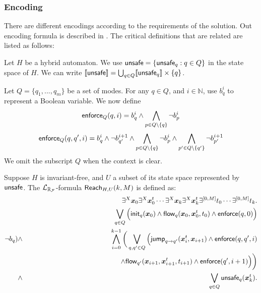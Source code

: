 \subsubsection{Encoding}
There are different encodings according to the requirements of the
solution. Out encoding formula is described in
\cite{gao2014delta}. The critical definitions that are related are
listed as follows:

\begin{definition}
Let $H$ be a hybrid automaton. We use $\mathsf{unsafe} = \{\mathsf{unsafe}_q:q\in Q\}$
in the state space of $H$. We can write $\llbracket \mathsf{unsafe}\rrbracket
= \bigcup_{q\in Q} \llbracket \mathsf{unsafe}_q \rrbracket\times \{q\}$.
\end{definition}

\begin{definition}
Let $Q = \{q_1,...,q_m\}$ be a set of modes. For any $q\in Q$, and
$i\in\mathbb{N}$, use $b_{q}^i$ to represent a Boolean variable. We
now define
$$\mathsf{enforce}_Q(q,i) = b^i_{q} \wedge \bigwedge_{p\in Q\setminus\{q\}}\neg b^{i}_{p}$$
$$\mathsf{enforce}_Q(q, q',i) = b^{i}_{q}\wedge \neg b^{i+1}_{q'} \wedge
\bigwedge_{p\in Q\setminus\{q\}} \neg b^i_{p} \wedge \bigwedge_{p'\in
  Q\setminus\{q'\}} \neg b^{i+1}_{p'}$$ We omit the subscript $Q$ when
the context is clear.
\end{definition}

\begin{definition}
Suppose $H$ is invariant-free, and $U$ a subset of its state space
represented by $\mathsf{unsafe}$. The $\mathcal{L}_{\mathbb{R}_{\mathcal{F}}}$-formula $\mathsf{Reach}_{H,U}(k,M)$ is
defined as:
\begin{eqnarray*}
& &\exists^X \vec x_{0} \exists^X\vec x_{0}^t\cdots \exists^X \vec
  x_{k}\exists^X\vec x_{k}^t\exists^{[0,M]}t_0\cdots
  \exists^{[0,M]}t_k.\\ & &\bigvee_{q\in Q} \Big(\init_{q}(\vec
  x_{0})\wedge \flow_{q}(\vec x_{0}, \vec x_{0}^t, t_0)\wedge
  \enforce(q,0)\Big)\\%
  \neg b_{q}) \wedge & & \bigwedge_{i=0}^{k-1}\bigg( \bigvee_{q, q'\in
    Q} \Big(\jump_{q\rightarrow q'}(\vec x_{i}^t, \vec x_{i+1})\wedge
  \enforce(q,q',i)\\ & & \hspace{4.7cm}\wedge\flow_{q'}(\vec x_{i+1},
  \vec x_{i+1}^t, t_{i+1})\wedge \enforce(q',i+1)\Big)\bigg)\\ \wedge
  & & \bigvee_{q\in Q} \unsafe_q(\vec x_{k}^t).
\end{eqnarray*}
\end{definition}

